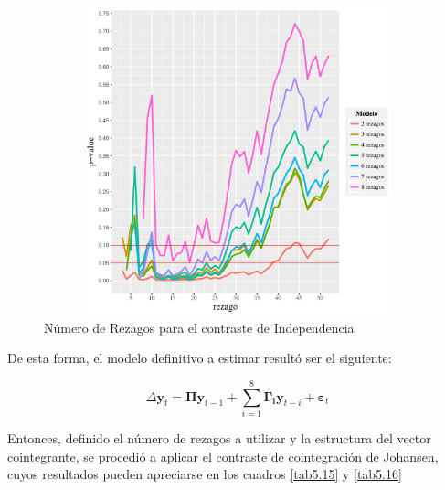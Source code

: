 \documentclass[12pt, twoside]{book}\usepackage[]{graphicx}\usepackage[]{color}
\newenvironment{knitrout}{}{} %
\numberwithin{equation}{section}
\numberwithin{theorem}{section}
\numberwithin{teorema}{section}
\numberwithin{defi}{section}
\numberwithin{prop}{section}
\numberwithin{defi}{section}
\theoremstyle{plain}
\begin{document}
\begin{knitrout}
\color{fgcolor}\begin{figure}[H]

{\centering \includegraphics[width=5in,height=3.5in]{figure/unnamed-chunk-18-1} 

}

\caption{Número de Rezagos para el contraste de Independencia\label{fig5.6}}\label{fig:unnamed-chunk-18}
\end{figure}


\end{knitrout}

De esta forma, el modelo definitivo a estimar resultó ser el siguiente: 

\begin{equation}
\Delta \mathbf{y}_{t} = \boldsymbol{\Pi}\mathbf{y}_{t-1}+\sum_{i=1}^{8}\boldsymbol{\Gamma_{i}}\mathbf{y}_{t-i}+\boldsymbol{\varepsilon}_{t}
\end{equation}

Entonces, definido el número de rezagos a utilizar y la estructura del vector cointegrante, se procedió a aplicar el contraste de cointegración de Johansen, cuyos resultados pueden apreciarse en los cuadros \ref{tab5.15} y \ref{tab5.16}
\end{document}
